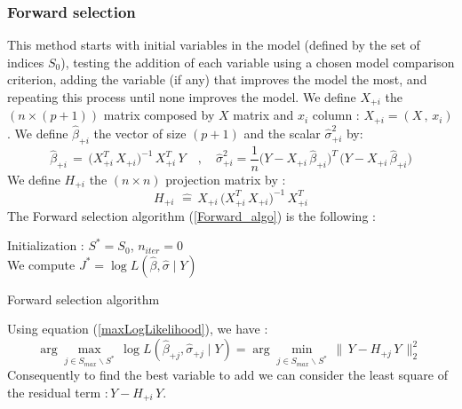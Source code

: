 \subsubsection{Forward selection}
This method starts with initial variables in the model (defined by the set of indices $S_0$), testing the addition of each variable
using a chosen model comparison criterion, adding the variable (if any) that improves the model the most, and repeating this process until none improves the model.
We define $X_{+i}$ the $(n \times (p+1))$ matrix composed by $X$ matrix and $x_i$ column : $X_{+i} = (X \,,\,x_i)$.
We define $\hat{\beta}_{+i}$ the vector of size $(p+1)$ and the scalar $\hat{\sigma}_{+i}^2$ by:
 \begin{equation}
  \hat{\beta}_{+i} \,=\, \big(X^T_{+i} \,X_{+i}\big)^{-1} \,X^T_{+i} \, Y
\quad,\quad
\hat{\sigma}_{+i}^2 = \frac{1}{n}\big(Y-X_{+i} \,\hat{\beta}_{+i}\big)^T\,\big(Y-X_{+i} \,\hat{\beta}_{+i}\big)
\end{equation}
We define $H_{+i} $ the $(n\times n)$ projection matrix by :
 \begin{equation}
\label{H+}
H_{+i}\, \,\hat{=} \, X_{+i}\,\big(X^T_{+i} \,X_{+i}\big)^{-1} \,X^T_{+i}
 \end{equation}
The Forward selection algorithm (\ref{Forward_algo}) is the following :
\begin{algorithm}
\label{Forward_algo}
Initialization : $S^* = S_0$, $n_{iter} = 0 $\\
We compute $J^* = \log L(\hat{\beta},\hat{\sigma}\mid Y)$  \\
\caption{Forward selection algorithm }
\end{algorithm}

Using equation (\ref{maxLogLikelihood}), we have :
 \begin{equation}
\arg   \displaystyle\max_{j \in S_{max} \backslash S^*}\,  \log L(\hat{\beta}_{+j},\hat{\sigma}_{+j}\mid Y) =
\arg \displaystyle\min_{j \in S_{max} \backslash S^*}\, \|\,Y-H_{+j}\,Y\,\|^2_2  \,\,
 \end{equation}
 Consequently to find the best variable to add we can consider the least square of the residual term $:Y-H_{+i}\,Y$.



